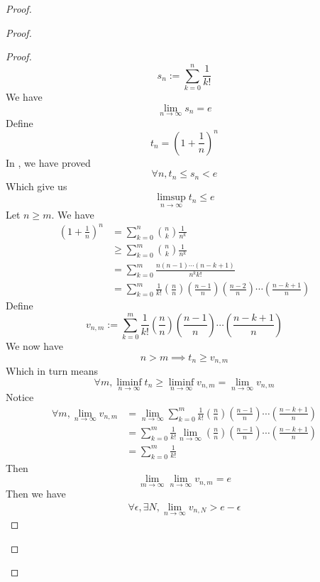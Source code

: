 \documentclass{report}
\begin{document}
\begin{proof}
\begin{proof}
\begin{proof}
\begin{equation}
s_n:=\sum_{k=0}^n \frac{1}{k!}
\end{equation}
We have
\begin{equation}
\lim_{n\to\infty}s_n=e
\end{equation}
Define 
\begin{equation}
t_n=(1+\frac{1}{n})^n
\end{equation}
In , we have proved
\begin{equation}
\forall n, t_n\leq s_n<e
\end{equation}
Which give us
\begin{equation}
\limsup_{n\to\infty} t_n\leq e
\end{equation}
Let $n\geq m$. We have
\begin{align}
  (1+\frac{1}{n})^n&= \sum_{k=0}^n \binom{n}{k}\frac{1}{n^k}\\
  &\geq \sum_{k=0}^m \binom{n}{k}\frac{1}{n^k}\\
  &=\sum_{k=0}^m \frac{n(n-1)\cdots (n-k+1)}{n^k k!}\\
  &=\sum_{k=0}^m \frac{1}{k!}(\frac{n}{n})(\frac{n-1}{n})(\frac{n-2}{n})\cdots (\frac{n-k+1}{n})
\end{align}
Define 
\begin{equation}
v_{n,m}:=\sum_{k=0}^m \frac{1}{k!}(\frac{n}{n})(\frac{n-1}{n})\cdots (\frac{n-k+1}{n})
\end{equation}
We now have
\begin{equation}
  n>m\implies t_n\geq v_{n,m}
\end{equation}
Which in turn means
\begin{equation}
\forall m, \liminf_{n\to\infty} t_n\geq \liminf_{n\to\infty} v_{n,m}=\lim_{n\to\infty} v_{n,m}
\end{equation}
Notice 
\begin{align}
\forall m,\lim_{n\to\infty} v_{n,m}&=\lim_{n\to\infty}\sum_{k=0}^m \frac{1}{k!}(\frac{n}{n})(\frac{n-1}{n})\cdots (\frac{n-k+1}{n})\\
&=\sum_{k=0}^m \frac{1}{k!}\lim_{n\to\infty}(\frac{n}{n})(\frac{n-1}{n})\cdots (\frac{n-k+1}{n})\\
&=\sum_{k=0}^m \frac{1}{k!}
\end{align}
Then
\begin{equation}
\lim_{m\to\infty}\lim_{n\to\infty}v_{n,m}=e
\end{equation}
Then we have
\begin{align}
  \forall \epsilon , \exists N, \lim_{n\to\infty}v_{n,N}>e-\epsilon 
\end{align}

\end{proof}
\end{proof}
\end{proof}
\end{document}
